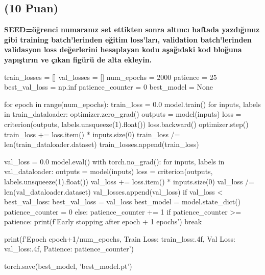 \documentclass[11pt]{article}
\begin{document}
\subsection{(10 Puan)} \textbf{SEED=öğrenci numaranız set ettikten sonra altıncı haftada yazdığımız gibi training batch'lerinden eğitim loss'ları, validation batch'lerinden validasyon loss değerlerini hesaplayan kodu aşağıdaki kod bloğuna yapıştırın ve çıkan figürü de alta ekleyin.}

\begin{python}
train_losses = []
val_losses = []
num_epochs = 2000
patience = 25
best_val_loss = np.inf
patience_counter = 0
best_model = None

for epoch in range(num_epochs):
    train_loss = 0.0
    model.train()
    for inputs, labels in train_dataloader:
        optimizer.zero_grad()
        outputs = model(inputs)
        loss = criterion(outputs, labels.unsqueeze(1).float())
        loss.backward()
        optimizer.step()
        train_loss += loss.item() * inputs.size(0)
    train_loss /= len(train_dataloader.dataset)
    train_losses.append(train_loss)
    
    val_loss = 0.0
    model.eval()
    with torch.no_grad():
        for inputs, labels in val_dataloader:
            outputs = model(inputs)
            loss = criterion(outputs, labels.unsqueeze(1).float())
            val_loss += loss.item() * inputs.size(0)
        val_loss /= len(val_dataloader.dataset)
        val_losses.append(val_loss)
        if val_loss < best_val_loss:
            best_val_loss = val_loss
            best_model = model.state_dict()
            patience_counter = 0
        else:
            patience_counter += 1
            if patience_counter >= patience:
                print(f'Early stopping after {epoch + 1} epochs')
                break

    print(f'Epoch {epoch+1}/{num_epochs}, Train Loss: {train_loss:.4f}, Val Loss: {val_loss:.4f}, Patience: {patience_counter}')

torch.save(best_model, 'best_model.pt')
\end{python}
\end{document}
